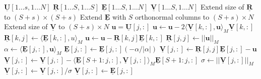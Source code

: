 \begin{algorithmic}
\Require $\mathbf{\underline{U}}[1 \dots s, 1 \dots N]$ 
\Require $\mathbf{\underline{R}}[1 \dots S, 1 \dots S]$  
\Require $\mathbf{\underline{E}}[1 \dots S, 1 \dots N]$ 
\Require $\mathbf{\underline{V}}[1 \dots S, 1 \dots N]$ 
\State Extend size of $\mathbf{\underline{R}}$ to $(S + s) \times (S + s)$
\State Extend $\mathbf{\underline{E}}$ with $S$ orthonormal columns to $(S + s) \times N$
\State Extend size of $\mathbf{\underline{V}}$ to $(S + s) \times N$
    \State $\mathbf{u} = \mathbf{\underline{U}}[j, :]$
        \State $\mathbf{u} \leftarrow \mathbf{u} - 2 \langle \mathbf{\underline{V}}[k, :], \mathbf{u} \rangle_M \mathbf{\underline{V}}[k, :]$
        \State $\mathbf{\underline{R}}[k, j] \leftarrow \langle \mathbf{\underline{E}}[k, :], u \rangle_M$
        \State $\mathbf{u} \leftarrow \mathbf{u} - \mathbf{\underline{R}}[k, j] \mathbf{\underline{E}}[k, :]$
    \EndFor
    \State $\mathbf{\underline{R}}[j, j] \leftarrow ||\mathbf{u}||_M$
    \State $\alpha \leftarrow \langle \mathbf{\underline{E}}[j, :], \mathbf{u} \rangle_M$
        \State $\mathbf{\underline{E}}[j, :] \leftarrow \mathbf{\underline{E}}[j, :] (-\alpha / |\alpha|)$
    \EndIf 
    \State $\mathbf{\underline{V}}[j, :] \leftarrow \mathbf{\underline{R}}[j, j] \mathbf{\underline{E}}[j, :] - \mathbf{u}$
    \State $\mathbf{\underline{V}}[j, :] \leftarrow \mathbf{\underline{V}}[j, :] - \langle \mathbf{\underline{E}}[S+1:j, :], \mathbf{\underline{V}}[j, :] \rangle_M \mathbf{\underline{E}}[S+1:j, :]$
    \State $\sigma \leftarrow ||\mathbf{\underline{V}}[j, :]||_M$
        \State $\mathbf{\underline{V}}[j, :] \leftarrow \mathbf{\underline{V}}[j, :] / \sigma$
    \Else
        \State $\mathbf{\underline{V}}[j, :] \leftarrow \mathbf{\underline{E}}[j, :]$
    \EndIf
\EndFor
\end{algorithmic}